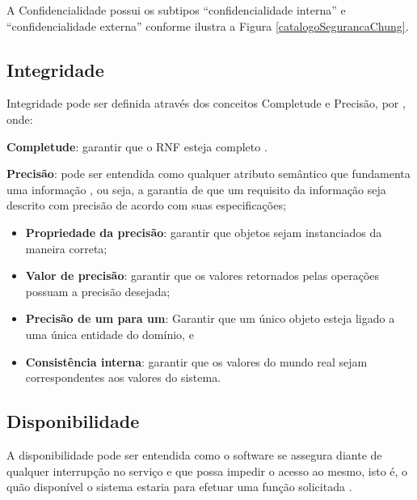 A Confidencialidade possui os subtipos “confidencialidade interna” e “confidencialidade externa” conforme ilustra a Figura \ref{catalogoSegurancaChung}.
 

\subsection{Integridade}
\label{subsec:integridade}
 
Integridade pode ser definida através dos conceitos Completude e Precisão, por \cite{chung2012non}, onde: 

\textbf{Completude}: garantir que o RNF esteja completo \cite{chung2012non}.

\textbf{Precisão}: pode ser entendida como qualquer atributo semântico que fundamenta uma informação \cite{chung2012non}, ou seja, a garantia de que um requisito da informação seja descrito com precisão de acordo com suas especificações; 

\begin{itemize}
	\item \textbf{Propriedade da precisão}: garantir que objetos sejam instanciados da maneira correta; 
	
	\item \textbf{Valor de precisão}: garantir que os valores retornados pelas operações possuam a precisão desejada;
	
	\item \textbf{Precisão de um para um}: Garantir que um único objeto esteja ligado a uma única entidade do domínio, e
	
	\item \textbf{Consistência interna}: garantir que os valores do mundo real sejam correspondentes aos valores do sistema.
\end{itemize}
 

\subsection{Disponibilidade}
\label{subsec:disponibilidade}

A disponibilidade pode ser entendida como o software se assegura diante de qualquer interrupção no serviço e que possa impedir o acesso ao mesmo, isto é, o quão disponível o sistema estaria para efetuar uma função solicitada \cite{chung2012non}.

